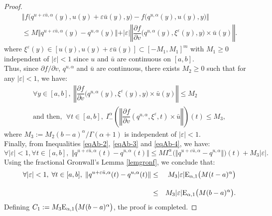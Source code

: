 \documentclass[english,11pt,reqno]{smfart}
\def\eps{\varepsilon}
\begin{document}
\begin{proof}
\begin{multline}\label{eqAb-3}
\Vert f\big( q^{u+ \eps \bar{u},\alpha}(y),u(y)+ \eps \bar{u}(y),y \big) - f\big( q^{u,\alpha}(y),u(y),y \big) \Vert \\ \leq M \Vert q^{u+ \eps \bar{u},\alpha}(y) - q^{u,\alpha}(y)\Vert + \vert \eps \vert \left\Vert \dfrac{\partial f}{\partial v} \big( q^{u,\alpha}(y),\xi^{\eps}(y),y \big) \times \bar{u}(y) \right\Vert.
\end{multline}
where $\xi^{\eps}(y) \in [u(y),u(y)+ \eps \bar{u}(y)] \subset [-M_1,M_1]^m$ with $M_1 \geq 0$ independent of $\vert \eps \vert < 1$ since $u$ and $\bar{u}$ are continuous on $[a,b]$. \\

Thus, since $\partial f / \partial v$, $q^{u,\alpha}$ and $\bar{u}$ are continuous, there exists $M_2 \geq 0$ such that for any $\vert \eps \vert < 1$, we have:
\begin{multline}\label{eqAb-4}
\forall y \in [a,b], \; \left\Vert \dfrac{\partial f}{\partial v} \big( q^{u,\alpha}(y),\xi^{\eps}(y),y \big) \times \bar{u}(y) \right\Vert \leq M_2 \\ \text{and then, } \; \forall t \in [a,b], \; I^{\alpha}_- \left( \left\Vert \dfrac{\partial f}{\partial v} ( q^{u,\alpha},\xi^{\eps},t ) \times \bar{u} \right\Vert \right) (t) \leq M_3,
\end{multline}
where $M_3 := M_2 (b-a)^\alpha / \Gamma ( \alpha +1)$ is independent of $\vert \eps \vert < 1$. \\

Finally, from Inequalities \eqref{eqAb-2}, \eqref{eqAb-3} and \eqref{eqAb-4}, we have:
\begin{equation}
\forall \vert \eps \vert < 1, \forall t \in [a,b], \; \Vert q^{u+ \eps \bar{u},\alpha} (t) -  q^{u,\alpha} (t) \Vert \leq M  I^{\alpha}_- \Big( \Vert q^{u+ \eps \bar{u},\alpha} - q^{u,\alpha}\Vert \Big) (t) +  M_3 \vert \eps \vert.
\end{equation}
Using the fractional Gronwall's Lemma \ref{lemgronf}, we conclude that:
\begin{eqnarray}
\forall \vert \eps \vert < 1, \; \forall t \in [a,b], \; \Vert q^{u+ \eps \bar{u},\alpha} (t) -  q^{u,\alpha} (t) \Vert & \leq & M_3 \vert \eps \vert {\rm E}_{\alpha,1} \big( M (t-a)^\alpha \big) \\[10pt]
& \leq & M_3 \vert \eps \vert {\rm E}_{\alpha,1} \big( M (b-a)^\alpha \big).
\end{eqnarray}
Defining $C_1 := M_3 {\rm E}_{\alpha,1} \big( M (b-a)^\alpha \big)$, the proof is completed.
\end{proof}
\end{document}

